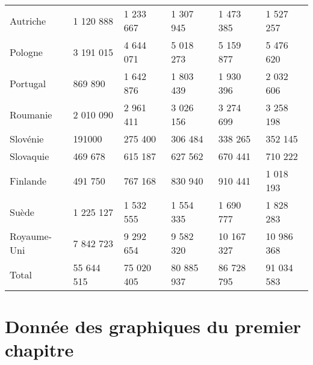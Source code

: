 \begin{table}[h!]
{\begin{tabular}{llllll}
Autriche                            & 1 120 888  & 1 233 667  & 1 307 945  & 1 473 385  & 1 527 257  \\
Pologne                             & 3 191 015  & 4 644 071  & 5 018 273  & 5 159 877  & 5 476 620  \\
Portugal                            & 869 890    & 1 642 876  & 1 803 439  & 1 930 396  & 2 032 606  \\
Roumanie                            & 2 010 090  & 2 961 411  & 3 026 156  & 3 274 699  & 3 258 198  \\
Slovénie                            & 191000     & 275 400    & 306 484    & 338 265    & 352 145    \\
Slovaquie                           & 469 678    & 615 187    & 627 562    & 670 441    & 710 222    \\
Finlande                            & 491 750    & 767 168    & 830 940    & 910 441    & 1 018 193  \\
Suède                               & 1 225 127  & 1 532 555  & 1 554 335  & 1 690 777  & 1 828 283  \\
Royaume-Uni                         & 7 842 723  & 9 292 654  & 9 582 320  & 10 167 327 & 10 986 368 \\
Total                               & 55 644 515 & 75 020 405 & 80 885 937 & 86 728 795 & 91 034 583
\end{tabular}}
\end{table}

\newpage
\newpage
\section{Donnée des graphiques du premier chapitre}
\begin{table}[h!]
\centering
\caption{Proportion de personnes agées de 65 ans et + sur base de \ref{pop1} et \ref{pop4}}
\label{my-label}
\end{table}


